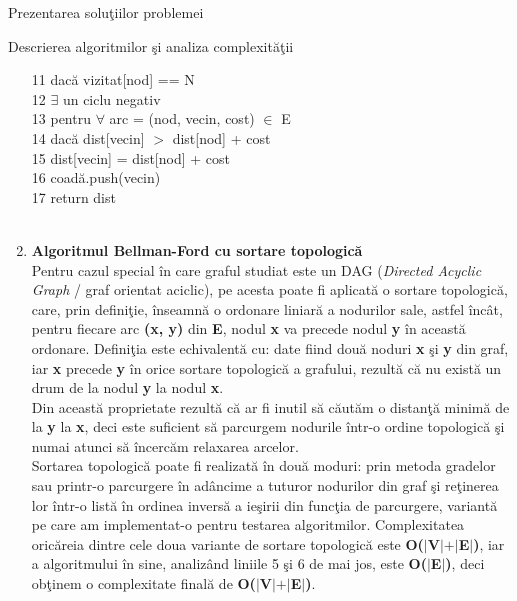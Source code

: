\documentclass[a4paper]{article}
\begin{document}
\begin{section}{Prezentarea solu\c tiilor problemei\\}
\begin{subsection}{Descrierea algoritmilor \c si analiza complexit\u a\c tii\\}
\begin{enumerate}
	11 \quad\quad\quad\quad\quad dac\u a vizitat[nod] == N \\
	12 \quad\quad\quad\quad\quad\quad\quad  $\exists$ un ciclu negativ \\

	13  \quad\quad\quad\quad\quad pentru $\forall$ arc = (nod, vecin, cost) $\in$ E \\
	14 \quad\quad\quad\quad\quad\quad\quad dac\u a dist[vecin] $>$ dist[nod] + cost \\
	15 \quad\quad\quad\quad\quad\quad\quad\quad\quad  dist[vecin] = dist[nod] + cost \\
	16 \quad\quad\quad\quad\quad\quad\quad\quad\quad  coad\u a.push(vecin) \\

	17 \quad\quad\quad return dist \\ \\

	\item \textbf{Algoritmul Bellman-Ford cu sortare topologic\u a\cite{clrs}} \\[0.4cm]
	Pentru cazul special \^ in care graful studiat este un DAG (\textit{Directed Acyclic Graph} / graf orientat aciclic), pe acesta poate fi aplicat\u a o sortare topologic\u a, care, prin defini\c tie, \^ inseamn\u a o ordonare liniar\u a a nodurilor sale, astfel \^ inc\^ at, pentru fiecare arc \textbf{(x, y)} din \textbf{E}, nodul \textbf{x} va precede nodul \textbf{y} \^ in aceast\u a ordonare. Defini\c tia este echivalent\u a cu: date fiind dou\u a noduri \textbf{x} \c si \textbf{y} din graf, iar \textbf{x} precede \textbf{y} \^ in orice sortare topologic\u a a grafului, rezult\u a c\u a nu exist\u a un drum de la nodul \textbf{y} la nodul \textbf{x}. \\
	Din aceast\u a proprietate rezult\u a c\u a ar fi inutil s\u a c\u aut\u am o distan\c t\u a minim\u a de la \textbf{y} la \textbf{x}, deci este suficient s\u a parcurgem nodurile \^ intr-o ordine topologic\u a \c si numai atunci s\u a \^ incerc\u am relaxarea arcelor. \\
	Sortarea topologic\u a poate fi realizat\u a \^ in dou\u a moduri: prin metoda gradelor sau printr-o parcurgere \^ in ad\^ ancime a tuturor nodurilor din graf \c si re\c tinerea lor \^ intr-o list\u a \^ in ordinea invers\u a a ie\c sirii din func\c tia de parcurgere, variant\u a pe care am implementat-o pentru testarea algoritmilor. Complexitatea oric\u areia dintre cele doua variante de sortare topologic\u a este \textbf{O($|$V$|$$+$$|$E$|$)}, iar a algoritmului \^ in sine, analiz\^ and liniile 5 \c si 6 de mai jos, este \textbf{O($|$E$|$)}, deci ob\c tinem o complexitate final\u a de \textbf{O($|$V$|$$+$$|$E$|$)}. \\\\


\end{enumerate}
\end{subsection}
\end{section}
\end{document}

